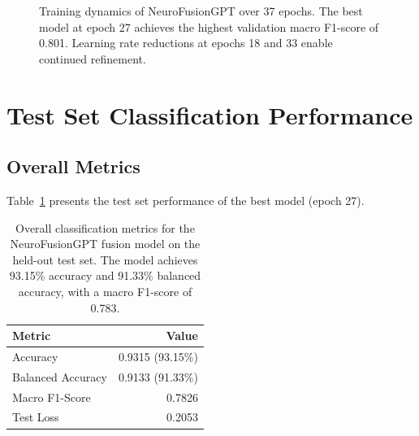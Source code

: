 \documentclass[12pt,letterpaper]{report}
\begin{document}
\begin{figure}[H]
\centering
{}
\caption[Training and validation curves]{Training dynamics of NeuroFusionGPT over 37 epochs. The best model at epoch 27 achieves the highest validation macro F1-score of 0.801. Learning rate reductions at epochs 18 and 33 enable continued refinement.}
\label{fig:training_curves}
\end{figure}

\section{Test Set Classification Performance}
\label{sec:test_results}

\subsection{Overall Metrics}

Table~\ref{tab:test_metrics} presents the test set performance of the best model (epoch 27).

\begin{table}[H]
\centering
\caption[Test set overall metrics]{Overall classification metrics for the NeuroFusionGPT fusion model on the held-out test set. The model achieves 93.15\% accuracy and 91.33\% balanced accuracy, with a macro F1-score of 0.783.}
\label{tab:test_metrics}
\begin{tabular}{lr}
\toprule
\textbf{Metric} & \textbf{Value} \\
\midrule
Accuracy & 0.9315 (93.15\%) \\
Balanced Accuracy & 0.9133 (91.33\%) \\
Macro F1-Score & 0.7826 \\
Test Loss & 0.2053 \\
\bottomrule
\end{tabular}
\end{table}
\end{document}
